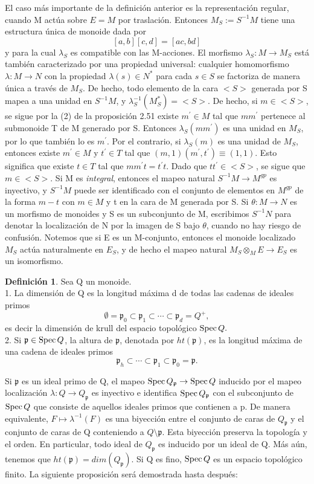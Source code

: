 \documentclass[12pt,spanish]{amsart}
\newcommand{\fk}[1]{\mathfrak{#1}}
\def\Spec{\mathop{\mbox{\normalfont Spec}}\nolimits}
\theoremstyle{definition}
\newtheorem{Def}[Theorem]{Definición}
\theoremstyle{remark}
\begin{document}
El caso más importante de la definición anterior es la representación regular, cuando M actúa sobre $E=M$ por traslación. Entonces $M_{S}:=S^{-1}M$ tiene una estructura única de monoide dada por
$$[a,b][c,d]=[ac,bd]$$
y para la cual $\lambda_{S}$ es compatible con las M-acciones. El morfismo $\lambda_{S}:M \to M_{S}$ está también caracterizado por una propiedad universal: cualquier homomorfismo $\lambda:M \to N$ con la propiedad $\lambda(s)\in N^{\ast}$ para cada $s\in S$ se factoriza de manera única a través de $M_{S}$. De hecho, todo elemento de la cara $<S>$ generada por S mapea a una unidad en $S^{-1}M$, y $\lambda_{S}^{-1}(M_{S}^{\ast}) = <S>$. De hecho, si $m\in <S>$, se sigue por la (2) de la proposición 2.51 existe $m^{\prime}\in M$ tal que $mm^{\prime}$ pertenece al submonoide T de M generado por S. Entonces $\lambda_{S}(mm^{\prime})$ es una unidad en $M_{S}$, por lo que también lo es $m^{\prime}$. Por el contrario, si $\lambda_{S}(m)$ es una unidad de $M_{S}$, entonces existe $m^{\prime}\in M$ y $t^{\prime}\in T$ tal que $(m,1)(m^{\prime},t^{\prime})\equiv (1,1)$. Esto significa que existe $t\in T$ tal que $mm^{\prime}t=t^{\prime}t$. Dado que $tt^{\prime}\in <S>$, se sigue que $m\in <S>$. Si M es \textit{integral}, entonces el mapeo natural $S^{-1}M \to M^{gp}$ es inyectivo, y $S^{-1}M$ puede ser identificado con el conjunto de elementos en $M^{gp}$ de la forma $m-t$ con $m\in M$ y t en la cara de M generada por S. Si $\theta: M \to N$ es un morfismo de monoides y S es un subconjunto de M, escribimos $S^{-1}N$ para denotar la localización de N por la imagen de S bajo $\theta$, cuando no hay riesgo de confusión. Notemos que si E es un M-conjunto, entonces el monoide localizado $M_{S}$ actúa naturalmente en $E_{S}$, y de hecho el mapeo natural $M_{S}\otimes_{M}E \to E_{S}$ es un isomorfismo. 


\begin{Def}
Sea Q un monoide. \\
1. La dimensión de Q es la longitud máxima d de todas las cadenas de ideales primos 
$$\emptyset =\fk{p}_{0} \subset \fk{p}_{1} \subset \cdots \subset \fk{p}_{d} = Q^{+},$$
es decir la dimensión de krull del espacio topológico $\Spec{Q}.$ \\ 
2. Si $\fk{p}\in \Spec{Q}$, la altura de $\fk{p}$, denotada por $ht(\fk{p})$, es la longitud máxima de una cadena de ideales primos 
$$\fk{p}_{h} \subset \cdots \subset \fk{p}_{1} \subset \fk{p}_{0}=\fk{p}.$$
\end{Def}

Si $\fk{p}$ es un ideal primo de Q, el mapeo $\Spec{Q_{\fk{p}}} \to \Spec{Q}$ inducido por el mapeo localización $\lambda:Q \to Q_{\fk{p}}$ es inyectivo e identifica $\Spec{Q_{\fk{p}}}$  con el subconjunto de $\Spec{Q}$ que consiste de aquellos ideales primos que contienen a p. De manera equivalente, $F \mapsto \lambda^{-1}(F)$ es una biyección entre el conjunto de caras de $Q_{\fk{p}}$ y el conjunto de caras de Q conteniendo a $Q\setminus \fk{p}$. Esta biyección preserva la topología y el orden. En particular, todo ideal de $Q_{\fk{p}}$ es inducido por un ideal de Q. Más aún, tenemos que $ht(\fk{p})=dim(Q_{\fk{p}})$. Si Q es fino, $\Spec{Q}$ es un espacio topológico finito. La siguiente proposición será demostrada hasta después:
\end{document}
